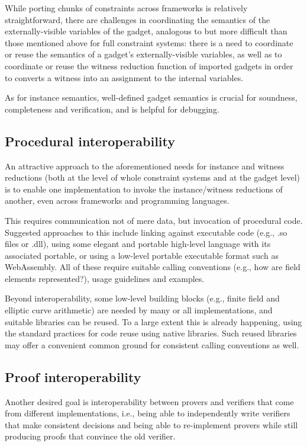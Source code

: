 While porting chunks of constraints across frameworks is relatively straightforward, there are challenges in coordinating the semantics of the externally-visible variables of the gadget, analogous to but more difficult than those mentioned above for full constraint systems: there is a need to coordinate or reuse the semantics of a gadget’s externally-visible variables, as well as to coordinate or reuse the witness reduction function of imported gadgets in order to converts a witness into an assignment to the internal variables.

As for instance semantics, well-defined gadget semantics is crucial for soundness, completeness and verification, and is helpful for debugging.

\subsection{Procedural interoperability}
An attractive approach to the aforementioned needs for instance and witness reductions (both at the level of whole constraint systems and at the gadget level) is to enable one implementation to invoke the instance/witness reductions of another, even across frameworks and programming languages.

This requires communication not of mere data, but invocation of procedural code. Suggested approaches to this include linking against executable code (e.g., .so files or .dll), using some elegant and portable high-level language with its associated portable, or using a low-level portable executable format such as WebAssembly. All of these require suitable calling conventions (e.g., how are field elements represented?), usage guidelines and examples.

Beyond interoperability, some low-level building blocks (e.g., finite field and elliptic curve arithmetic) are needed by many or all implementations, and suitable libraries can be reused. To a large extent this is already happening, using the standard practices for code reuse using native libraries. Such reused libraries may offer a convenient common ground for consistent calling conventions as well.

\subsection{Proof interoperability}
Another desired goal is interoperability between provers and verifiers that come from different implementations, i.e., being able to independently write verifiers that make consistent decisions and being able to re-implement provers while still producing proofs that convince the old verifier.


